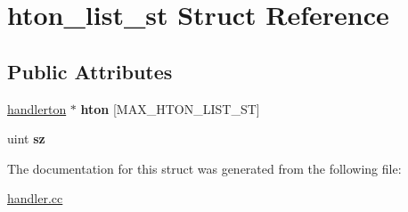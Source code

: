 \hypertarget{structhton__list__st}{}\section{hton\+\_\+list\+\_\+st Struct Reference}
\label{structhton__list__st}
\subsection*{Public Attributes}
\begin{DoxyCompactItemize}
\item 
\mbox{\label{structhton__list__st_a7706764ff7ab8fa0a82db99c59b9ee4b}} 
\mbox{\hyperlink{structhandlerton}{handlerton}} $\ast$ {\bfseries hton} \mbox{[}M\+A\+X\+\_\+\+H\+T\+O\+N\+\_\+\+L\+I\+S\+T\+\_\+\+ST\mbox{]}
\item 
\mbox{\label{structhton__list__st_a52e0fd2bd52fac3dbc1d3088993989cb}} 
uint {\bfseries sz}
\end{DoxyCompactItemize}


The documentation for this struct was generated from the following file\+:\begin{DoxyCompactItemize}
\item 
\mbox{\hyperlink{handler_8cc}{handler.\+cc}}\end{DoxyCompactItemize}
